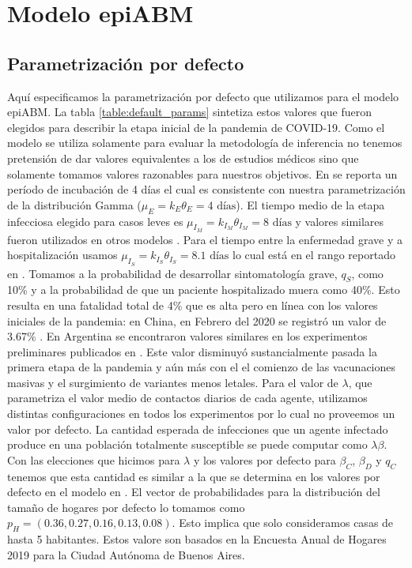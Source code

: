 \chapter{Modelo epiABM}
\section{Parametrización por defecto}\label{appendix:epi_abm_default_params}

Aquí especificamos la parametrización por defecto que utilizamos para el modelo epiABM. La tabla \ref{table:default_params} sintetiza estos valores que fueron elegidos para describir la etapa inicial de la pandemia de COVID-19. Como el modelo se utiliza solamente para evaluar la metodología de inferencia no tenemos pretensión de dar valores equivalentes a los de estudios médicos sino que solamente tomamos valores razonables para nuestros objetivos. En \cite{Guan2020} se reporta un período de incubación de 4 días el cual es consistente con nuestra parametrización de la distribución Gamma ($\mu_E = k_E \theta_E = 4\text{ días}$). El tiempo medio de la etapa infecciosa elegido para casos leves es $\mu_{I_M} = k_{I_M} \theta_{I_M} = 8 \text{ días}$ y valores similares fueron utilizados en otros modelos \citep{Zhao2020, Ivorra2020}. Para el tiempo entre la enfermedad grave y a hospitalización usamos $\mu_{I_S} = k_{I_S} \theta_{I_S} = 8.1 \text{ días}$ lo cual está en el rango reportado en \cite{Faes2020}. Tomamos a la probabilidad de desarrollar sintomatología grave, $q_S$, como 10\% y a la probabilidad de que un paciente hospitalizado muera como 40\%. Esto resulta en una fatalidad total de 4\% que es alta pero en línea con los valores iniciales de la pandemia: en China, en Febrero del 2020 se registró un valor de 3.67\% \citep{Verity2020}. En Argentina se encontraron valores similares en los experimentos preliminares publicados en \cite{Evensen2020}. Este valor disminuyó sustancialmente pasada la primera etapa de la pandemia y aún más con el el comienzo de las vacunaciones masivas y el surgimiento de variantes menos letales. Para el valor de $\lambda$, que parametriza el valor medio de contactos diarios de cada agente, utilizamos distintas configuraciones en todos los experimentos por lo cual no proveemos un valor por defecto. La cantidad esperada de infecciones que un agente infectado produce en una población totalmente susceptible se puede computar como $\lambda \beta$. Con las elecciones que hicimos para $\lambda$ y los valores por defecto para $\beta_C$, $\beta_D$ y $q_C$ tenemos que esta cantidad es similar a la que se determina en los valores por defecto en el modelo en \cite{Kerr2020}. El vector de probabilidades para la distribución del tamaño de hogares por defecto lo tomamos como $p_H = (0.36, 0.27, 0.16, 0.13, 0.08)$. Esto implica que solo consideramos casas de hasta 5 habitantes. Estos valore son basados en la Encuesta Anual de Hogares 2019 para la Ciudad Autónoma de Buenos Aires.

